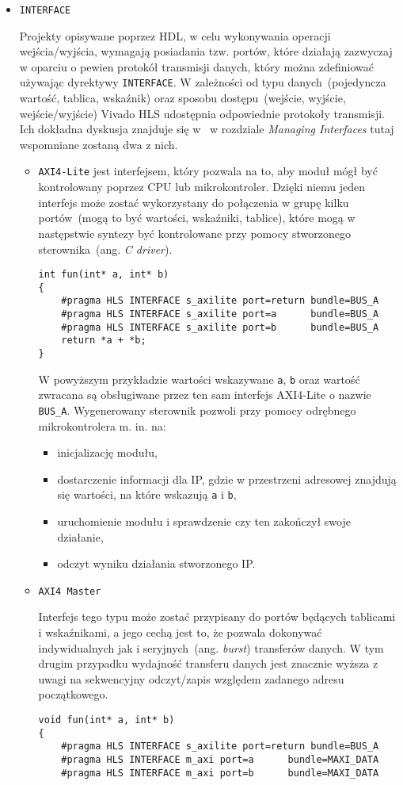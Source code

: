 \begin{itemize}
\item \texttt{INTERFACE}

Projekty opisywane poprzez HDL, w celu wykonywania operacji wejścia/wyjścia, wymagają posiadania tzw. portów, które działają zazwyczaj w oparciu o pewien protokół transmisji danych, który można zdefiniować używając dyrektywy \texttt{INTERFACE}. W zależności od typu danych~(pojedyncza wartość, tablica, wskaźnik) oraz sposobu dostępu~(wejście, wyjście, wejście/wyjście) Vivado HLS udostępnia odpowiednie protokoły transmisji. Ich dokładna dyskusja znajduje się w~\cite{UG902} w rozdziale \textit{Managing Interfaces} tutaj wspomniane zostaną dwa z nich.
\begin{itemize}
\item \texttt{AXI4-Lite} jest interfejsem, który pozwala na to, aby moduł mógł być kontrolowany poprzez CPU lub mikrokontroler. Dzięki niemu jeden interfejs może zostać wykorzystany do połączenia w grupę kilku portów~(mogą to być wartości, wskaźniki, tablice), które mogą w następstwie syntezy być kontrolowane przy pomocy stworzonego sterownika~(ang. \textit{C driver}). 
\begin{lstlisting}[caption=Przykład użycia interfejsu AXI4-Lite]
int fun(int* a, int* b)
{
	#pragma HLS INTERFACE s_axilite port=return bundle=BUS_A
	#pragma HLS INTERFACE s_axilite port=a 		bundle=BUS_A
	#pragma HLS INTERFACE s_axilite port=b 		bundle=BUS_A
	return *a + *b;
}
\end{lstlisting}
W powyższym przykładzie wartości wskazywane \texttt{a}, \texttt{b} oraz wartość zwracana są obsługiwane przez ten sam interfejs AXI4-Lite o nazwie \texttt{BUS\_A}. Wygenerowany sterownik pozwoli przy pomocy odrębnego mikrokontrolera m. in. na:
\begin{itemize}
\item inicjalizację modułu,
\item dostarczenie informacji dla IP, gdzie w przestrzeni adresowej znajdują się wartości, na które wskazują \texttt{a} i \texttt{b},
\item uruchomienie modułu i sprawdzenie czy ten zakończył swoje działanie,
\item odczyt wyniku działania stworzonego IP.
\end{itemize}
\item \texttt{AXI4 Master}

Interfejs tego typu może zostać przypisany do portów będących tablicami i wskaźnikami, a jego cechą jest to, że pozwala dokonywać indywidualnych jak i seryjnych~(ang. \textit{burst}) transferów danych. W tym drugim przypadku wydajność transferu danych jest znacznie wyższa z uwagi na sekwencyjny odczyt/zapis względem zadanego adresu początkowego.
\begin{lstlisting}[caption=Przykład użycia interfejsu AXI4 Master z seryjnym dostępem do danych. Zmiana adresów wskazywanych umożliwiona została poprzez interfejs AXI4-Lite]
void fun(int* a, int* b)
{
	#pragma HLS INTERFACE s_axilite port=return bundle=BUS_A
	#pragma HLS INTERFACE m_axi port=a 		bundle=MAXI_DATA
	#pragma HLS INTERFACE m_axi port=b 		bundle=MAXI_DATA


\end{lstlisting}
\end{itemize}
\end{itemize}
